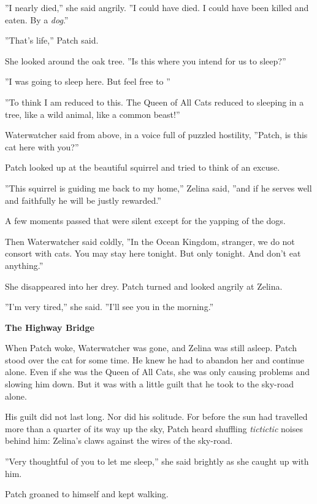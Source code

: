 \documentclass[11pt]{article}
\begin{document}
''I nearly died,'' she said angrily. ''I could have died. I could have been killed and eaten. By a {\it dog}.''\par
''That's life,'' Patch said.\par
She looked around the oak tree. ''Is this where you intend for us to sleep?''\par
''I was going to sleep here. But feel free to%
''\par
''To think I am reduced to this. The Queen of All Cats reduced to sleeping in a tree, like a wild animal, like a common beast!''\par
Waterwatcher said from above, in a voice full of puzzled hostility, ''Patch, is this cat here with you?''\par
Patch looked up at the beautiful squirrel and tried to think of an excuse.\par
''This squirrel is guiding me back to my home,'' Zelina said, ''and if he serves well and faithfully he will be justly rewarded.''\par
A few moments passed that were silent except for the yapping of the dogs.\par
Then Waterwatcher said coldly, ''In the Ocean Kingdom, stranger, we do not consort with cats. You may stay here tonight. But only tonight. And don't eat anything.''\par
She disappeared into her drey. Patch turned and looked angrily at Zelina.\par
''I'm very tired,'' she said. ''I'll see you in the morning.''\par
\par
{\bf The Highway Bridge\par
}\par
 When Patch woke, Waterwatcher was gone, and Zelina was still asleep. Patch stood over the cat for some time. He knew he had to abandon her and continue alone. Even if she was the Queen of All Cats, she was only causing problems and slowing him down. But it was with a little guilt that he took to the sky-road alone.\par
 His guilt did not last long. Nor did his solitude. For before the sun had travelled more than a quarter of its way up the sky, Patch heard shuffling {\it tictictic} noises behind him: Zelina's claws against the wires of the sky-road.\par
 ''Very thoughtful of you to let me sleep,'' she said brightly as she caught up with him.\par
 Patch groaned to himself and kept walking.\par
\end{document}
